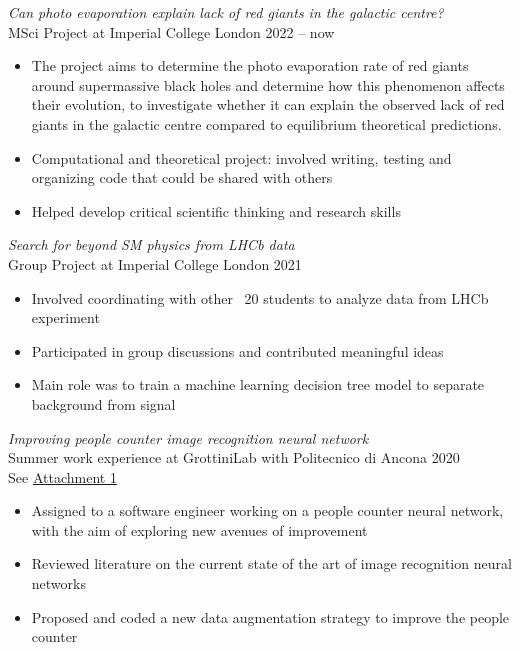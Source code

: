 \documentclass{res} %
\begin{document}
\begin{resume}
{\sl Can photo evaporation explain lack of red giants in the galactic centre?}\\ MSci Project at Imperial College London \hfill 2022 -- now
\begin{itemize}
\item The project aims to determine the photo evaporation rate of red giants around supermassive black holes and determine how this phenomenon affects their evolution, to investigate whether it can explain the observed lack of red giants in the galactic centre compared to equilibrium theoretical predictions.
\item Computational and theoretical project: involved writing, testing and organizing code that could be shared with others
\item Helped develop critical scientific thinking and research skills
\end{itemize}

{\sl Search for beyond SM physics from LHCb data}\\ Group Project at Imperial College London \hfill 2021
\begin{itemize}
\item Involved coordinating with other ~20 students to analyze data from LHCb experiment
\item Participated in group discussions and contributed meaningful ideas
\item Main role was to train a machine learning decision tree model to separate background from signal
\end{itemize}

{\sl Improving people counter image recognition neural network} \\ Summer work experience at GrottiniLab with Politecnico di Ancona \hfill 2020 \\ See \href{https://github.com/jacopouggeri/curriculumVitae/blob/84ad9712112b11ea237b126a98ba1764b27054b4/attachments/grottini.pdf}{Attachment 1}
\begin{itemize}
\item Assigned to a software engineer working on a people counter neural network, with the aim of exploring new avenues of improvement
\item Reviewed literature on the current state of the art of image recognition neural networks
\item Proposed and coded a new data augmentation strategy to improve the people counter
\end{itemize}


\end{resume}
\end{document}
